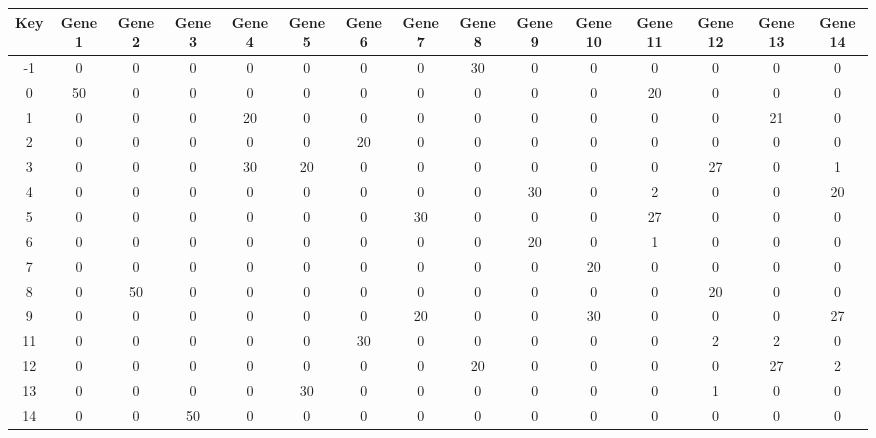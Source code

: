 \begin{tabular}{|c|c|c|c|c|c|c|c|c|c|c|c|c|c|c|}
\hline
Key & Gene 1 & Gene 2 & Gene 3 & Gene 4 & Gene 5 & Gene 6 & Gene 7 & Gene 8 & Gene 9 & Gene 10 & Gene 11 & Gene 12 & Gene 13 & Gene 14 \\
\hline
-1 & 0 & 0 & 0 & 0 & 0 & 0 & 0 & 30 & 0 & 0 & 0 & 0 & 0 & 0 \\
0 & 50 & 0 & 0 & 0 & 0 & 0 & 0 & 0 & 0 & 0 & 20 & 0 & 0 & 0 \\
1 & 0 & 0 & 0 & 20 & 0 & 0 & 0 & 0 & 0 & 0 & 0 & 0 & 21 & 0 \\
2 & 0 & 0 & 0 & 0 & 0 & 20 & 0 & 0 & 0 & 0 & 0 & 0 & 0 & 0 \\
3 & 0 & 0 & 0 & 30 & 20 & 0 & 0 & 0 & 0 & 0 & 0 & 27 & 0 & 1 \\
4 & 0 & 0 & 0 & 0 & 0 & 0 & 0 & 0 & 30 & 0 & 2 & 0 & 0 & 20 \\
5 & 0 & 0 & 0 & 0 & 0 & 0 & 30 & 0 & 0 & 0 & 27 & 0 & 0 & 0 \\
6 & 0 & 0 & 0 & 0 & 0 & 0 & 0 & 0 & 20 & 0 & 1 & 0 & 0 & 0 \\
7 & 0 & 0 & 0 & 0 & 0 & 0 & 0 & 0 & 0 & 20 & 0 & 0 & 0 & 0 \\
8 & 0 & 50 & 0 & 0 & 0 & 0 & 0 & 0 & 0 & 0 & 0 & 20 & 0 & 0 \\
9 & 0 & 0 & 0 & 0 & 0 & 0 & 20 & 0 & 0 & 30 & 0 & 0 & 0 & 27 \\
11 & 0 & 0 & 0 & 0 & 0 & 30 & 0 & 0 & 0 & 0 & 0 & 2 & 2 & 0 \\
12 & 0 & 0 & 0 & 0 & 0 & 0 & 0 & 20 & 0 & 0 & 0 & 0 & 27 & 2 \\
13 & 0 & 0 & 0 & 0 & 30 & 0 & 0 & 0 & 0 & 0 & 0 & 1 & 0 & 0 \\
14 & 0 & 0 & 50 & 0 & 0 & 0 & 0 & 0 & 0 & 0 & 0 & 0 & 0 & 0 \\
\hline
\end{tabular}